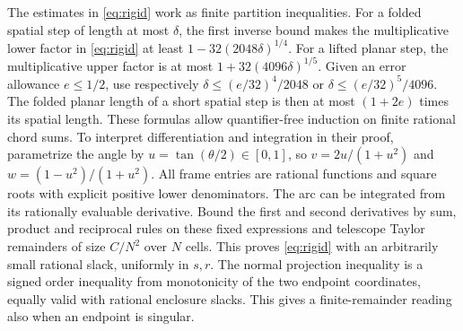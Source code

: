 \documentclass[10pt,letterpaper]{article}
\begin{document}
\par The estimates in \eqref{eq:rigid} work as finite partition inequalities. For a folded spatial step of length at most $\delta$, the first inverse bound makes the multiplicative lower factor in \eqref{eq:rigid} at least $1-32(2048\delta)^{1/4}$. For a lifted planar step, the multiplicative upper factor is at most $1+32(4096\delta)^{1/5}$. Given an error allowance $e\le1/2$, use respectively $\delta\le(e/32)^4/2048$ or $\delta\le(e/32)^5/4096$. The folded planar length of a short spatial step is then at most $(1+2e)$ times its spatial length. These formulas allow quantifier-free induction on finite rational chord sums. To interpret differentiation and integration in their proof, parametrize the angle by $u=\tan(\theta/2)\in[0,1]$, so $v=2u/(1+u^2)$ and $w=(1-u^2)/(1+u^2)$. All frame entries are rational functions and square roots with explicit positive lower denominators. The arc can be integrated from its rationally evaluable derivative. Bound the first and second derivatives by sum, product and reciprocal rules on these fixed expressions and telescope Taylor remainders of size $C/N^2$ over $N$ cells. This proves \eqref{eq:rigid} with an arbitrarily small rational slack, uniformly in $s,r$. The normal projection inequality is a signed order inequality from monotonicity of the two endpoint coordinates, equally valid with rational enclosure slacks. This gives a finite-remainder reading also when an endpoint is singular.
\end{document}
